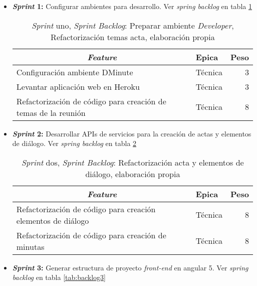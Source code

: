 \begin{itemize}
	\item \textbf{\textit{Sprint} 1:} Configurar ambientes para desarrollo. Ver \textit{spring backlog} en tabla \ref{tab:backlog1}

\begin{table}[!h]
\centering
\caption{\textit{Sprint} uno, \textit{Sprint Backlog}: Preparar ambiente \textit{Developer}, Refactorización temas acta, elaboración propia}
\label{tab:backlog1}
\begin{tabular}{|l|l|r|}
\hline
\multicolumn{1}{|c|}{\textit{\textbf{Feature}}} & \textbf{Epica} & \textbf{Peso} \\ \hline
Configuración ambiente DMinute & Técnica & 3 \\ \hline
Levantar aplicación web en Heroku & Técnica & 3 \\ \hline
Refactorización de código para creación de temas de la reunión & Técnica & 8 \\ \hline
\end{tabular}
\end{table}

	\item \textbf{\textit{Sprint} 2:} Desarrollar APIs de servicios para la creación de actas y elementos de diálogo. Ver \textit{spring backlog} en tabla \ref{tab:backlog2}

\begin{table}[!h]
\centering
\caption{\textit{Sprint} dos, \textit{Sprint Backlog}: Refactorización acta y elementos de diálogo, elaboración propia}
\label{tab:backlog2}
\begin{tabular}{|l|l|r|}
\hline
\multicolumn{1}{|c|}{\textit{\textbf{Feature}}} & \textbf{Epica} & \textbf{Peso} \\ \hline
Refactorización de código para creación elementos de diálogo & Técnica & 8 \\ \hline
Refactorización de código para creación de minutas & Técnica & 8 \\ \hline
\end{tabular}
\end{table}

	\item \textbf{\textit{Sprint} 3:} Generar estructura de proyecto \textit{front-end} en angular 5. Ver \textit{spring backlog} en tabla \ref{tab:backlog3}


\end{itemize}
